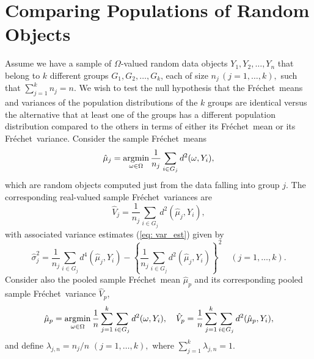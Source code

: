 \documentclass[lineno]{biometrika}
\newcommand{\be}{\begin{eqnarray}}
\newcommand{\ee}{\end{eqnarray}}
\newcommand{\no}{\noindent}
\newcommand{\la}{\label}
\def\O{\Omega}
\def\F{Fr\'{e}chet}
\begin{document}
\section{Comparing Populations of Random Objects}
\label{sec: k-sample test}
 \no  Assume we have  a  sample of $\O$-valued random data objects $Y_1,Y_2,\dots,Y_n$ 
that belong to $k$ different groups $G_1,G_2,\ldots,G_k$, each of size $n_j \, (j=1,\ldots,k),$ such that
$\sum_{j=1}^{k} n_j=n$. We wish to test the null hypothesis that the \F \ means and variances of the population distributions of the $k$ groups are identical versus the alternative that at least one of the groups has a different population distribution compared to the others in terms of either its \F \ mean or its \F \ variance. Consider  the sample \F \ means 
\begin{equation*}
\hat{\mu}_j=\operatornamewithlimits{argmin}_{\omega \in \Omega} \frac{1}{n_j}\sum_{i \in G_j}d^2(\omega,Y_i) ,
\end{equation*} which are random objects computed just from the data falling into group $j$. The  corresponding real-valued sample \F \ variances are 
\begin{equation*}
\hat{V}_j=\frac{1}{n_j}\sum_{i \in G_j} d^2(\hat{\mu}_j,Y_i), 
\end{equation*} with associated  variance estimates (\ref{eq: var_est}) given by 
\begin{equation*}
\hat{\sigma}^2_j=\frac{1}{n_j}\sum_{i \in G_j} d^4(\hat{\mu}_j,Y_i) - \left \{\frac{1}{n_j}\sum_{i \in G_j} d^2(\hat{\mu}_j,Y_i) \right\}^2 \quad (j=1,\ldots,k).
\end{equation*}Consider also the  pooled sample \F \ mean $\hat{\mu}_p$ and its corresponding pooled sample \F\ variance  $\hat{V}_p$, 
\be \la{pe} \hat{\mu}_p=\operatornamewithlimits{argmin}_{\omega \in \Omega} \frac{1}{n}\sum_{j=1}^{k}\sum_{i \in G_j} d^2(\omega,Y_i), \quad \hat{V}_p= \frac{1}{n}\sum_{j=1}^{k}\sum_{i \in G_j} d^2(\hat{\mu}_p,Y_i),  \ee
and 
define  $\lambda_{j,n}=n_j/n \,\,  (j=1,\dots,k),$ where $\sum_{j=1}^{k} \lambda_{j,n}=1$.
\end{document}
